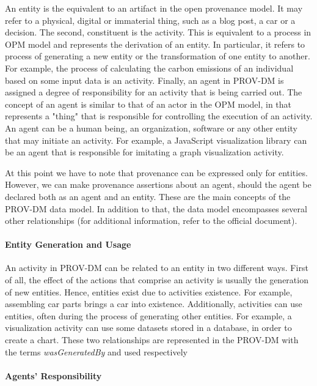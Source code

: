 An entity is the equivalent to an artifact in the open provenance model. It may refer to a physical, digital or immaterial thing, such as a blog post, a car or a decision. The second, constituent is the activity. This is equivalent to a process in OPM model and represents the derivation of an entity. In particular, it refers to process of generating a new entity or the transformation of one entity to another. For example, the process of calculating the carbon emissions of an individual based on some input data is an activity. Finally, an agent in PROV-DM is assigned a degree of responsibility for an activity that is being carried out. The concept of an agent is similar to that of an actor in the OPM model, in that represents a "thing" that is responsible for controlling the execution of an activity. An agent can be a human being, an organization, software or any other entity that may initiate an activity. For example, a JavaScript visualization library can be an agent that is responsible for imitating a graph visualization activity.

At this point we have to note that provenance can be expressed only for entities. However, we can make provenance assertions about an agent, should the agent be declared both as an agent and an entity.
These are the main concepts of the PROV-DM data model. In addition to that, the data model encompasses several other relationships (for additional information, refer to the official document\cite{reference15}).


\paragraph{Entity Generation and Usage}

An activity in PROV-DM can be related to an entity in two different ways.  First of all, the effect of the actions that comprise an activity is usually the generation of new entities. Hence, entities exist due to activities existence. For example, assembling car parts brings a car into existence. Additionally, activities can use entities, often during the process of generating other entities. For example, a visualization activity can use some datasets stored in a database, in order to create a chart. These two relationships are represented in the PROV-DM with the terms \emph{wasGeneratedBy} and used respectively

\paragraph{Agents' Responsibility}

